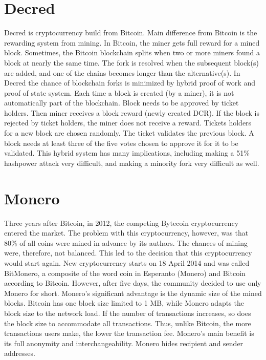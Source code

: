 \section{Decred}
Decred is cryptocurrency build from Bitcoin. Main difference from Bitcoin is the rewarding system from mining. In Bitcoin, the miner gets full reward for a mined block. Sometimes, the Bitcoin blockchain splits when two or more miners found a block at nearly the same time. The fork is resolved when the subsequent block(s) are added, and one of the chains becomes longer than the alternative(s). In Decred the chance of blockchain forks is minimized by hybrid proof of work and proof of state system. Each time a block is created (by a miner), it is not automatically part of the blockchain. Block needs to be approved by ticket holders. Then miner receives a block reward (newly created DCR). If the block is rejected by ticket holders, the miner does not receive a reward. Tickets holders for a new block are chosen randomly. The ticket validates the previous block. A block needs at least three of the five votes chosen to approve it for it to be validated.  This hybrid system has many implications, including making a 51\% hashpower attack very difficult, and making a minority fork very difficult as well.\cite{decredWhitePaper}

\section{Monero}
Three years after Bitcoin, in 2012, the competing Bytecoin cryptocurrency entered the market. The problem with this cryptocurrency, however, was that 80\% of all coins were mined in advance by its authors. The chances of mining were, therefore, not balanced. This led to the decision that this cryptocurrency would start again. New cryptocurrency starts on 18 April 2014 and was called BitMonero, a composite of the word coin in Esperanto (Monero) and Bitcoin according to Bitcoin. However, after five days, the community decided to use only Monero for short. Monero's significant advantage is the dynamic size of the mined blocks. Bitcoin has one block size limited to 1 MB, while Monero adapts the block size to the network load. If the number of transactions increases, so does the block size to accommodate all transactions. Thus, unlike Bitcoin, the more transactions users make, the lower the transaction fee. Monero's main benefit is its full anonymity and interchangeability. Monero hides recipient and sender addresses.\cite{moneroTracebility}

